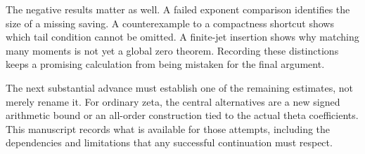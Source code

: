 The negative results matter as well. A failed exponent comparison identifies the size of a missing saving. A counterexample to a compactness shortcut shows which tail condition cannot be omitted. A finite-jet insertion shows why matching many moments is not yet a global zero theorem. Recording these distinctions keeps a promising calculation from being mistaken for the final argument.

The next substantial advance must establish one of the remaining estimates, not merely rename it. For ordinary zeta, the central alternatives are a new signed arithmetic bound or an all-order construction tied to the actual theta coefficients. This manuscript records what is available for those attempts, including the dependencies and limitations that any successful continuation must respect.
